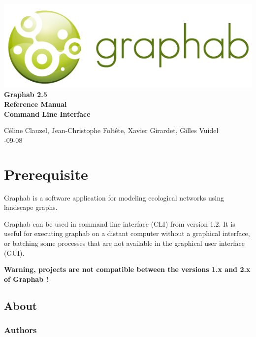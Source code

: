 \documentclass[a4paper,10pt]{report}
\begin{document}
\begin{titlepage}
	
	\centering
	\includegraphics[scale=0.5]{img/logo.png}\\
	
	\bigskip
	\bigskip
	\bigskip	
	{\Huge
		\bfseries
		Graphab 2.5\\
		\bigskip
		Reference Manual\\
		Command Line Interface\\
	}
	\bigskip
	\bigskip
	\bigskip
	\bigskip
	\bigskip
	
	{\Large		
		Céline Clauzel, Jean-Christophe Foltête, Xavier Girardet, Gilles Vuidel\\
		-09-08\\
	}
	
\end{titlepage}

\tableofcontents

\chapter{Prerequisite}
Graphab is a software application for modeling ecological networks using landscape graphs.

Graphab can be used in command line interface (CLI) from version 1.2.
It is useful for executing graphab on a distant computer without a graphical interface, or batching some processes that are not available in the graphical user interface (GUI).

\textbf{Warning, projects are not compatible between the versions 1.x and 2.x of Graphab !}

\section{About}

\subsection{Authors}
\end{document}

